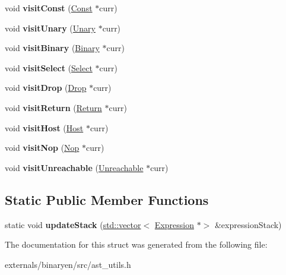 \begin{DoxyCompactItemize}
void {\bfseries visit\+Const} (\mbox{\hyperlink{classwasm_1_1_const}{Const}} $\ast$curr)
\item 
\mbox{\label{structwasm_1_1_re_finalize_node_af91366f5d714cbceaa560c34d35d8478}} 
void {\bfseries visit\+Unary} (\mbox{\hyperlink{classwasm_1_1_unary}{Unary}} $\ast$curr)
\item 
\mbox{\label{structwasm_1_1_re_finalize_node_a7b844307e0270b7c1dfc0fffb4eb191b}} 
void {\bfseries visit\+Binary} (\mbox{\hyperlink{classwasm_1_1_binary}{Binary}} $\ast$curr)
\item 
\mbox{\label{structwasm_1_1_re_finalize_node_a1b2d97e6a9bb73aab4bf720f50f20972}} 
void {\bfseries visit\+Select} (\mbox{\hyperlink{classwasm_1_1_select}{Select}} $\ast$curr)
\item 
\mbox{\label{structwasm_1_1_re_finalize_node_aa1404b8bc063cf897b2efff101c5c4ba}} 
void {\bfseries visit\+Drop} (\mbox{\hyperlink{classwasm_1_1_drop}{Drop}} $\ast$curr)
\item 
\mbox{\label{structwasm_1_1_re_finalize_node_a5eef25a67aba8cb14e5c00bd9ae9417f}} 
void {\bfseries visit\+Return} (\mbox{\hyperlink{classwasm_1_1_return}{Return}} $\ast$curr)
\item 
\mbox{\label{structwasm_1_1_re_finalize_node_a9f15fdc6898b5eddca79647945ec86b7}} 
void {\bfseries visit\+Host} (\mbox{\hyperlink{classwasm_1_1_host}{Host}} $\ast$curr)
\item 
\mbox{\label{structwasm_1_1_re_finalize_node_a5463a9967a34b57fe1e089aa5338e27b}} 
void {\bfseries visit\+Nop} (\mbox{\hyperlink{classwasm_1_1_nop}{Nop}} $\ast$curr)
\item 
\mbox{\label{structwasm_1_1_re_finalize_node_a94b0409fe15b83810b5b98b3c104aa21}} 
void {\bfseries visit\+Unreachable} (\mbox{\hyperlink{classwasm_1_1_unreachable}{Unreachable}} $\ast$curr)
\end{DoxyCompactItemize}
\subsection*{Static Public Member Functions}
\begin{DoxyCompactItemize}
\item 
\mbox{\label{structwasm_1_1_re_finalize_node_a439a4eb19a1ca7f827abe8003ec1f63a}} 
static void {\bfseries update\+Stack} (\mbox{\hyperlink{classstd_1_1vector}{std\+::vector}}$<$ \mbox{\hyperlink{classwasm_1_1_expression}{Expression}} $\ast$$>$ \&expression\+Stack)
\end{DoxyCompactItemize}


The documentation for this struct was generated from the following file\+:\begin{DoxyCompactItemize}
\item 
externals/binaryen/src/ast\+\_\+utils.\+h\end{DoxyCompactItemize}
